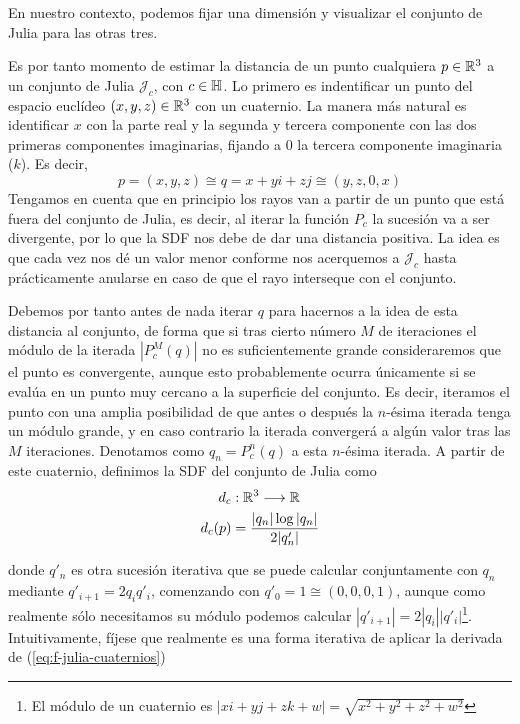 En nuestro contexto, podemos fijar una dimensión y visualizar el conjunto de Julia para las otras tres. 

Es por tanto momento de estimar la distancia de un punto cualquiera $p\in\mathbb{R}^3$ a un conjunto de Julia $\mathcal{J}_c$, con $c\in\mathbb{H}$. Lo primero es indentificar un punto del espacio euclídeo $(x,y,z)\in\mathbb{R}^3$ con un cuaternio. La manera más natural es identificar $x$ con la parte real y la segunda y tercera componente con las dos primeras componentes imaginarias, fijando a $0$ la tercera componente imaginaria ($k$). Es decir,
\begin{equation}
    p=(x,y,z)\cong q = x + yi + zj \cong (y,z,0,x)
\end{equation}
Tengamos en cuenta que en principio los rayos van a partir de un punto que está fuera del conjunto de Julia, es decir, al iterar la función $P_c$ la sucesión va a ser divergente, por lo que la SDF nos debe de dar una distancia positiva. La idea es que cada vez nos dé un valor menor conforme nos acerquemos a $\mathcal{J}_c$ hasta prácticamente anularse en caso de que el rayo interseque con el conjunto. 

Debemos por tanto antes de nada iterar $q$ para hacernos a la idea de esta distancia al conjunto, de forma que si tras cierto número $M$ de iteraciones el módulo de la iterada $|P_c^M(q)|$ no es suficientemente grande consideraremos que el punto es convergente, aunque esto probablemente ocurra únicamente si se evalúa en un punto muy cercano a la superficie del conjunto. Es decir, iteramos el punto con una amplia posibilidad de que antes o después la $n$-ésima iterada tenga un módulo grande, y en caso contrario la iterada convergerá a algún valor tras las $M$ iteraciones. Denotamos como $q_n=P_c^n(q)$ a esta $n$-ésima iterada. A partir de este cuaternio, definimos la SDF del conjunto de Julia como 
\begin{equation}
    \label{eq:SDF-Julia}
    \begin{split}
        d_c&:\mathbb{R}^3\longrightarrow\mathbb{R} \\
        d_c(p) &= \dfrac{|q_n|\log|q_n|}{2|q'_n|}
    \end{split}
\end{equation}

donde $q'_n$ es otra sucesión iterativa que se puede calcular conjuntamente con $q_n$ mediante $q'_{i+1}=2q_i q'_i$, comenzando con $q'_0=1\cong(0,0,0,1)$, aunque como realmente sólo necesitamos su módulo podemos calcular $|q'_{i+1}|=2|q_i||q'_i|$\footnote{El módulo de un cuaternio es $|xi+yj+zk+w|=\sqrt{x^2+y^2+z^2+w^2}$}. Intuitivamente, fíjese que realmente es una forma iterativa de aplicar la derivada de (\ref{eq:f-julia-cuaternios})

